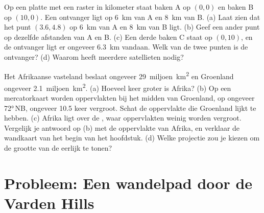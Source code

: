 \begin{exercise}[$\star\star\star$]\label{exo:g9:maps-of-the-earth:11}
Op een platte  met een raster in kilometer staat baken A op $(0, 0)$
en baken B op $(10, 0)$. Een ontvanger ligt op \qty{6}{km} van A en
\qty{8}{km} van B. (a) Laat zien dat het punt $(3.6, 4.8)$ op \qty{6}{km}
van A en \qty{8}{km} van B ligt. (b) Geef een ander punt op dezelfde
afstanden van A en B. (c) Een derde baken C staat op $(0, 10)$, en de
ontvanger ligt er ongeveer \qty{6.3}{km} vandaan. Welk van de twee punten
is de ontvanger? (d) Waarom heeft  meerdere
satellieten nodig?
\end{exercise}

\begin{exercise}[$\star\star\star$]\label{exo:g9:maps-of-the-earth:12}
Het Afrikaanse vasteland beslaat ongeveer 29~miljoen~\unit{km^2} en
Groenland ongeveer 2.1~miljoen~\unit{km^2}. (a) Hoeveel keer groter is
Afrika? (b) Op een mercatorkaart worden oppervlakten bij het midden van
Groenland, op ongeveer \ang{72}\,NB, ongeveer 10.5 keer vergroot. Schat de
oppervlakte die Groenland lijkt te hebben. (c) Afrika ligt over de ,
waar oppervlakten weinig worden vergroot. Vergelijk je antwoord op (b) met
de oppervlakte van Afrika, en verklaar de wandkaart van het begin van het
hoofdstuk. (d) Welke projectie zou je kiezen om de grootte van de
 eerlijk te tonen?
\end{exercise}

\section{Probleem: Een wandelpad door de Varden Hills}

